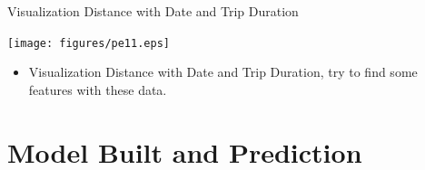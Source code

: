 \documentclass[
 size=14pt,
 paper=smartboard,  %
 mode=present, 		%
 display=slides, 	%
 style=tuliplab,  	%
 pauseslide,
 fleqn,leqno]{powerdot}
\begin{document}
\begin{slide}{Visualization Distance with Date and Trip Duration}
	{\begin{flushleft}
			\texttt{[image: figures/pe11.eps]}
		\end{flushleft}
	}

\begin{itemize}
	\item
	\smallskip
	Visualization Distance with Date and Trip Duration, try to find some features with these data.
	
\end{itemize}

\end{slide}




\section{Model Built and Prediction}

\end{document}
